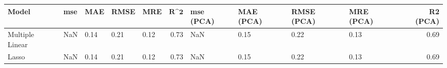 \begin{table}
\centering
\label{table:iri_reg_pred}
\begin{tabular}{lllllrllllr}
\toprule
 \textbf{Model} & \textbf{mse} & \textbf{MAE} & \textbf{RMSE} & \textbf{MRE} & $\textbf{R^2}$ & \textbf{mse (PCA)} & \textbf{MAE (PCA)} & \textbf{RMSE (PCA)} & \textbf{MRE (PCA)} & \textbf{R2 (PCA)} \\
\midrule
Multiple Linear &          NaN &         0.14 &          0.21 &         0.12 &           0.73 &                NaN &               0.15 &                0.22 &               0.13 &              0.69 \\
          Lasso &          NaN &         0.14 &          0.21 &         0.12 &           0.73 &                NaN &               0.15 &                0.22 &               0.13 &              0.69 \\
\bottomrule
\end{tabular}
\end{table}

